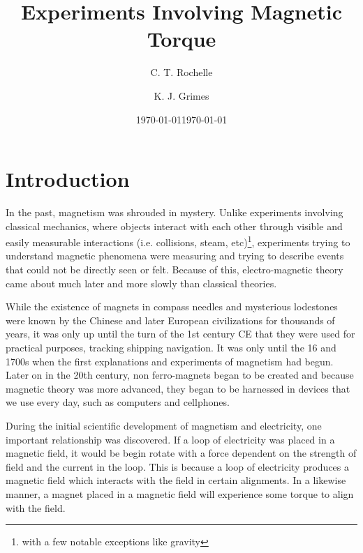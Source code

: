 \documentclass[aps,prl,10pt,twocolumn,floatfix]{revtex4-2}
\begin{document}


\title{Experiments Involving Magnetic Torque}
\author{C. T. Rochelle}
\author{K. J. Grimes}
\date{\today}
\date{\today}

\maketitle

\section{Introduction}\label{Intro}
In the past, magnetism was shrouded in mystery. 
Unlike experiments involving classical mechanics, where objects interact with each other through visible and easily measurable interactions (i.e. collisions, steam, etc)\footnote{with a few notable exceptions like gravity}, experiments trying to understand magnetic phenomena were measuring and trying to describe events that could not be directly seen or felt.
Because of this, electro-magnetic theory came about much later and more slowly than classical theories. 

While the existence of magnets in compass needles and mysterious lodestones were known by the Chinese and later European civilizations for thousands of years, it was only up until the turn of the 1st century CE that they were used for practical purposes, tracking shipping navigation\cite{History}.
It was only until the 16 and 1700s when the first explanations and experiments of magnetism had begun. 
Later on in the 20th century, non ferro-magnets began to be created and because magnetic theory was more advanced, they began to be harnessed in devices that we use every day, such as computers and cellphones.
 
During the initial scientific development of magnetism and electricity, one important relationship was discovered.
If a loop of electricity was placed in a magnetic field, it would be begin rotate with a force dependent on the strength of field and the current in the loop. 
This is because a loop of electricity produces a magnetic field which interacts with the field in certain alignments. 
In a likewise manner, a magnet placed in a magnetic field will experience some torque to align with the field. 
\end{document}
